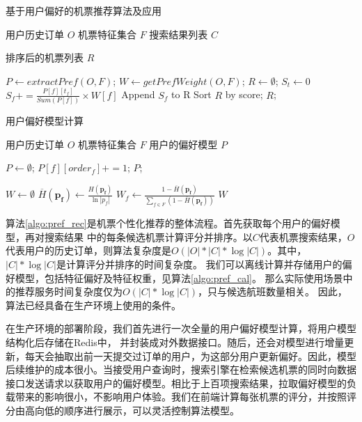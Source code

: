 \begin{algorithm}
\caption{基于用户偏好的机票推荐算法及应用}
\label{algo:pref_rec}
\begin{algorithmic}[1]
\Require
\Statex 用户历史订单 $O$
\Statex 机票特征集合 $F$
\Statex 搜索结果列表 $C$

\Ensure 排序后的机票列表 $R$

\State $P \gets extractPref(O,F)$;
\State $W \gets getPrefWeight(O,F)$;
\State $R \gets \emptyset$;
\State $S_t \gets 0$
\State $S_f += \frac{P[f][t_f]}{Sum(P[f])} \times W[f] $
\EndFor
\State Append $S_f$ to R
\EndFor 
\State Sort $R$ by score;
\State \Return $R$;
\end{algorithmic}
\end{algorithm}


\begin{algorithm}
\caption{用户偏好模型计算}
\label{algo:pref_cal}
\begin{algorithmic}[1]
\Require
\Statex 用户历史订单 $O$
\Statex 机票特征集合 $F$
\Ensure
\Statex 用户的偏好模型 $P$

\State $P \gets \emptyset$;
\State $P[f][order_f] += 1$;
\EndFor	
\EndFor 
\State \Return $P$;
\EndFunction

\State $W \gets \emptyset$
\State $\overline{H}(\mathbf{p_f}) \gets \frac{H(\mathbf{p_f})}{\ln |p_f|}$
\EndFor
{}
\State $W_f \gets \frac{1 - \overline{H}(\mathbf{p_f})}{\sum_{f \in F}(1 - \overline{H}(\mathbf{p_f}))}$
\EndFor
\State \Return $W$
\EndFunction

\end{algorithmic}
\end{algorithm}\par

算法\ref{algo:pref_rec}是机票个性化推荐的整体流程。首先获取每个用户的偏好模型，再对搜索结果
中的每条候选机票计算评分并排序。以$C$代表机票搜索结果，$O$代表用户的历史订单，则算法复杂度是$O(|O|*|C|*\log|C|)$。其中，$|C|*\log|C|$是计算评分并排序的时间复杂度。
我们可以离线计算并存储用户的偏好模型，包括特征偏好及特征权重，见算法\ref{algo:pref_cal}。
那么实际使用场景中的推荐服务时间复杂度仅为$O(|C|*\log|C|)$，只与候选航班数量相关。
因此，算法已经具备在生产环境上使用的条件。\par
在生产环境的部署阶段，我们首先进行一次全量的用户偏好模型计算，将用户模型结构化后存储在Redis中，
并封装成对外数据接口。随后，还会对模型进行增量更新，每天会抽取出前一天提交过订单的用户，为这部分用户更新偏好。因此，模型后续维护的成本很小。当接受用户查询时，搜索引擎在检索候选机票的同时向数据接口发送请求以获取用户的偏好模型。相比于上百项搜索结果，拉取偏好模型的负载带来的影响很小，不影响用户体验。我们在前端计算每张机票的评分，并按照评分由高向低的顺序进行展示，可以灵活控制算法模型。\par

